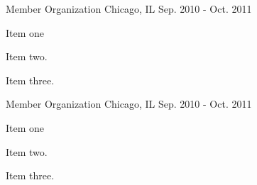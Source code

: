 

\begin{cventries}

  \cventry
    {Member} %
    {Organization} %
    {Chicago, IL} %
    {Sep. 2010 - Oct. 2011} %
    {
      \begin{cvitems} %
        \item {Item one}
        \item {Item two.}
        \item {Item three.}
      \end{cvitems}
    }

  \cventry
    {Member} %
    {Organization} %
    {Chicago, IL} %
    {Sep. 2010 - Oct. 2011} %
    {
      \begin{cvitems} %
        \item {Item one}
        \item {Item two.}
        \item {Item three.}
      \end{cvitems}
    }

\end{cventries}

